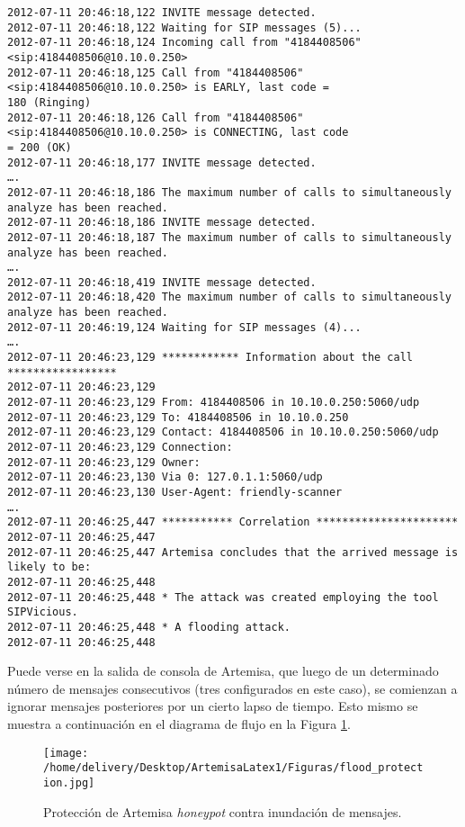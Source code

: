 \documentclass[a4paper,12pt]{report}
\newenvironment{myscriptlisting}
{\begin{list}{}{\setlength{\leftmargin}{1em}}\item\scriptsize\bfseries}
{\end{list}}
\begin{document}
\begin{myscriptlisting}
 \begin{verbatim}
2012-07-11 20:46:18,122 INVITE message detected.
2012-07-11 20:46:18,122 Waiting for SIP messages (5)...
2012-07-11 20:46:18,124 Incoming call from "4184408506" <sip:4184408506@10.10.0.250>
2012-07-11 20:46:18,125 Call from "4184408506" <sip:4184408506@10.10.0.250> is EARLY, last code =
180 (Ringing)
2012-07-11 20:46:18,126 Call from "4184408506" <sip:4184408506@10.10.0.250> is CONNECTING, last code
= 200 (OK)
2012-07-11 20:46:18,177 INVITE message detected.
….
2012-07-11 20:46:18,186 The maximum number of calls to simultaneously analyze has been reached.
2012-07-11 20:46:18,186 INVITE message detected.
2012-07-11 20:46:18,187 The maximum number of calls to simultaneously analyze has been reached.
….
2012-07-11 20:46:18,419 INVITE message detected.
2012-07-11 20:46:18,420 The maximum number of calls to simultaneously analyze has been reached.
2012-07-11 20:46:19,124 Waiting for SIP messages (4)...
….
2012-07-11 20:46:23,129 ************ Information about the call *****************
2012-07-11 20:46:23,129 
2012-07-11 20:46:23,129 From: 4184408506 in 10.10.0.250:5060/udp
2012-07-11 20:46:23,129 To: 4184408506 in 10.10.0.250
2012-07-11 20:46:23,129 Contact: 4184408506 in 10.10.0.250:5060/udp
2012-07-11 20:46:23,129 Connection: 
2012-07-11 20:46:23,129 Owner: 
2012-07-11 20:46:23,130 Via 0: 127.0.1.1:5060/udp
2012-07-11 20:46:23,130 User-Agent: friendly-scanner
….
2012-07-11 20:46:25,447 *********** Correlation **********************
2012-07-11 20:46:25,447 
2012-07-11 20:46:25,447 Artemisa concludes that the arrived message is likely to be:
2012-07-11 20:46:25,448 
2012-07-11 20:46:25,448 * The attack was created employing the tool SIPVicious.
2012-07-11 20:46:25,448 * A flooding attack.
2012-07-11 20:46:25,448 
 \end{verbatim}
\end{myscriptlisting}

Puede verse en la salida de consola de Artemisa, que luego de un determinado número 
de mensajes consecutivos (tres configurados en este caso), se comienzan a
ignorar mensajes posteriores por un cierto lapso de tiempo. Esto mismo se
muestra a continuación en el diagrama de flujo en la Figura \ref{SVWAR_INVITE_flood_protection}.
 
\begin{figure}[h!] 
\centering
\texttt{[image: /home/delivery/Desktop/ArtemisaLatex1/Figuras/flood\_protection.jpg]}
\caption{Protección de Artemisa \emph{honeypot} contra inundación de mensajes.}
\label{SVWAR_INVITE_flood_protection}
\end{figure}
\end{document}
